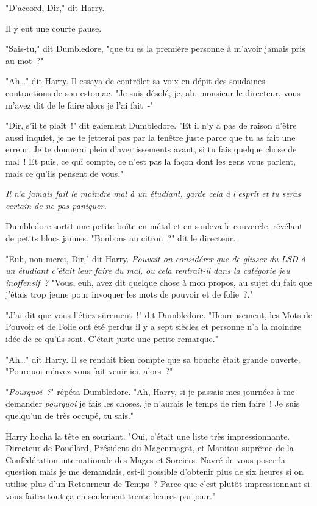 "D'accord, Dir," dit Harry.

Il y eut une courte pause.

"Sais-tu," dit Dumbledore, "que tu es la première personne à m'avoir jamais pris au mot~?"

"Ah…" dit Harry. Il essaya de contrôler sa voix en dépit des soudaines contractions de son estomac. "Je suis désolé, je, ah, monsieur le directeur, vous m'avez dit de le faire alors je l'ai fait~-"

"Dir, s'il te plaît~!" dit gaiement Dumbledore. "Et il n'y a pas de raison d'être aussi inquiet, je ne te jetterai pas par la fenêtre juste parce que tu as fait une erreur. Je te donnerai plein d'avertissements avant, si tu fais quelque chose de mal~! Et puis, ce qui compte, ce n'est pas la façon dont les gens vous parlent, mais ce qu'ils pensent de vous."

\emph{Il n'a jamais fait le moindre mal à un étudiant, garde cela à l'esprit et tu seras certain de ne pas paniquer.}

Dumbledore sortit une petite boîte en métal et en souleva le couvercle, révélant de petits blocs jaunes. "Bonbons au citron~?" dit le directeur.

"Euh, non merci, Dir," dit Harry. \emph{Pouvait-on considérer que de glisser du LSD à un étudiant c'était leur faire du mal, ou cela rentrait-il dans la catégorie jeu inoffensif~?} "Vous, euh, avez dit quelque chose à mon propos, au sujet du fait que j'étais trop jeune pour invoquer les mots de pouvoir et de folie~?."

"J'ai dit que vous l'étiez sûrement~!" dit Dumbledore. "Heureusement, les Mots de Pouvoir et de Folie ont été perdus il y a sept siècles et personne n'a la moindre idée de ce qu'ils sont. C'était juste une petite remarque."

"Ah…" dit Harry. Il se rendait bien compte que sa bouche était grande ouverte. "Pourquoi m'avez-vous fait venir ici, alors~?"

"\emph{Pourquoi~?}" répéta Dumbledore. "Ah, Harry, si je passais mes journées à me demander \emph{pourquoi} je fais les choses, je n'aurais le temps de rien faire~! Je suis quelqu'un de très occupé, tu sais."

Harry hocha la tête en souriant. "Oui, c'était une liste très impressionnante. Directeur de Poudlard, Président du Magenmagot, et Manitou suprême de la Confédération internationale des Mages et Sorciers. Navré de vous poser la question mais je me demandais, est-il possible d'obtenir plus de six heures si on utilise plus d'un Retourneur de Temps~? Parce que c'est plutôt impressionnant si vous faites tout ça en seulement trente heures par jour."

